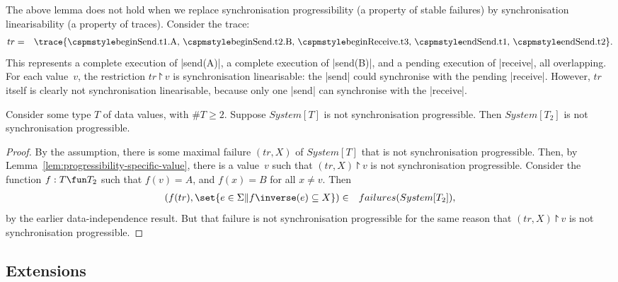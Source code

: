 \begin{note}
The above lemma does not hold when we replace synchronisation progressibility
(a property of stable failures) by synchronisation linearisability (a property
of traces).  Consider the trace:
\begin{eqnarray*}
tr &  =  &
  \trace{ \CSPMMR{beginSend.t1.A},\, \CSPMMR{beginSend.t2.B},\, 
    \CSPMMR{beginReceive.t3},\, \CSPMMR{endSend.t1},\, \CSPMMR{endSend.t2} }.
\end{eqnarray*}
This represents a complete execution of |send(A)|, a complete execution of
|send(B)|, and a pending execution of |receive|, all overlapping.  For each
value~$v$, the restriction $tr \project v$ is synchronisation linearisable:
the |send| could synchronise with the pending |receive|.  However, $tr$ itself
is clearly not synchronisation linearisable, because only one |send| can
synchronise with the |receive|.
\end{note}


\begin{prop}
Consider some type $T$ of data values, with $\#T \ge 2$.  Suppose $System[T]$
is not synchronisation progressible.  Then $System[T_2]$ is not
synchronisation progressible.
\end{prop}

\begin{proof}
By the assumption, there is some maximal failure $(tr,X)$ of $System[T]$ that
is not synchronisation progressible.  Then, by
Lemma~\ref{lem:progressibility-specific-value}, there is a value~$v$ such that
$(tr,X) \project v$ is not synchronisation progressible.
%
Consider the function $f: T \fun T_2$ such that $f(v) = A$, and $f(x) = B$ for
all $x \ne v$.  Then 
\begin{eqnarray*}
(f(tr), \set{e \in \Sigma \| f\inverse(e) \subseteq X}) & \in &
   failures(System[T_2]),
\end{eqnarray*}
by the earlier data-independence result.  But that failure is not
synchronisation progressible for the same reason that $(tr,X) \project v$ is
not synchronisation progressible.
\end{proof}



\subsection{Extensions}
\label{sec:di-extensions}

